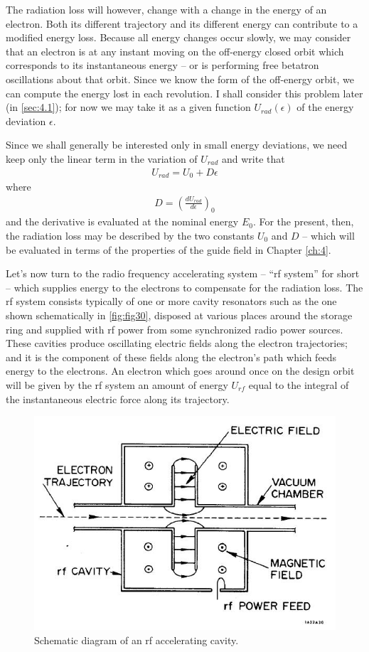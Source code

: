 The radiation loss will however, change with a change in the energy of an electron. Both its different trajectory and its different energy can contribute to a modified energy loss. Because all energy changes occur slowly, we may consider that an electron is at any instant moving on the off-energy
 closed orbit which corresponds to its instantaneous energy -- or is performing free betatron oscillations about that orbit. Since we know the form of the off-energy orbit, we can compute the energy lost in each revolution. I shall consider this problem later (in \autoref{sec:4.1}); for now we may take it as a given function $U_{rad}(\epsilon)$ of the energy deviation $\epsilon$.

Since we shall generally be interested only in small energy deviations, we need keep only the linear term in the variation of $U_{rad}$ and write that
\begin{align}
	U_{rad} = U_0 + D\epsilon\label{eq:3.23}
\end{align}
where
\begin{align} \label{eq:3.24}
	D = \left(\frac{dU_{rad}}{d\epsilon}\right)_0
\end{align}
and the derivative is evaluated at the nominal energy $E_0$. For the present, then, the radiation loss may be described by the two constants $U_0$ and $D$ -- which will be evaluated in terms of the properties of the guide field in Chapter \ref{ch:4}.

Let's now turn to the radio frequency accelerating system -- “rf system” for short -- which supplies energy to the electrons to compensate for the radiation loss. The rf system consists typically of one or more cavity resonators such as the one shown schematically in \autoref{fig:fig30}, disposed at various places around the storage ring
and supplied with rf power from some synchronized radio power sources. These cavities produce oscillating electric fields along the electron trajectories; and it is the component of these fields along the electron's path which feeds energy to the electrons. An electron which goes around once on the design orbit will be given by the rf system an amount of energy $U_{rf}$ equal to the integral of the instantaneous electric force along its trajectory.

 \begin{figure}[!htb]
 	\centering
 	\includegraphics[width=0.7\linewidth]{./Figuras/fig30.jpeg}
 	\caption{Schematic diagram of an rf accelerating cavity.}
 	\label{fig:fig30}
 \end{figure}

